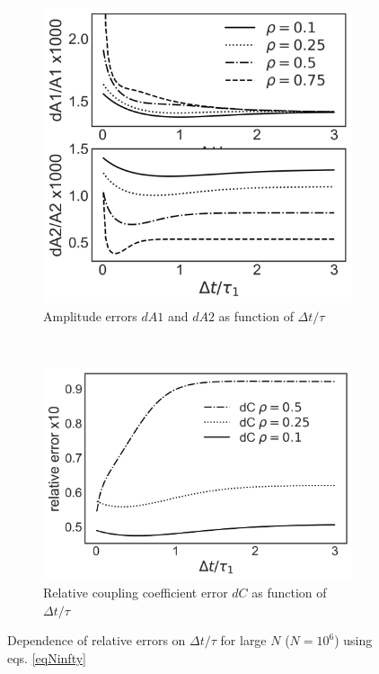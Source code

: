 \documentclass[%
 reprint,
 amsmath,amssymb,
 aps,
]{revtex4-1}
\begin{document}
\begin{figure}[H]
    \centering
    \begin{subfigure}[b]{0.4\textwidth}
        \includegraphics[width=\textwidth]{dA.png}
        \caption{Amplitude errors $dA1$ and $dA2$ as function of $\Delta t/\tau$}
        \label{fig:error_A}
    \end{subfigure}
    ~ %
    \begin{subfigure}[b]{0.4\textwidth}
        \includegraphics[width=\textwidth]{dC.png}
        \caption{Relative coupling coefficient error $dC$ as function of $\Delta t/\tau$}
        \label{fig:error_C}
    \end{subfigure}
    \caption{Dependence of relative errors on $\Delta t/\tau$ for large $N$ ($N=10^{6}$) using eqs. \ref{eqNinfty}}\label{fig:error_fig}
\end{figure}
\end{document}
